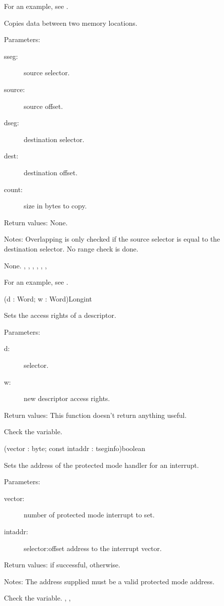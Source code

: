 For an example, see .

{Copies data between two memory locations.

Parameters: 
\begin{description}
\item[sseg:\ ] source selector. 
\item[source:\ ] source offset. 
\item[dseg:\ ] destination selector.
\item[dest:\ ] destination offset.
\item[count:\ ] size in bytes to copy.
\end{description}

Return values: None.

Notes: Overlapping is only checked if the source selector is equal to the
destination selector. No range check is done.
}
{ None.}
{ 
,
,
,
,
,
,
 }

For an example, see 
.

{(d : Word; w : Word)}{Longint}
{
Sets the access rights of a descriptor.

Parameters: 
\begin{description}
\item[d:\ ] selector.
\item[w:\ ] new descriptor access rights.
\end{description}

Return values: This function doesn't return anything useful.
}
{ Check the  variable.}
{
 }

{(vector : byte; const intaddr : tseginfo)}{boolean}
{Sets the address of the protected mode handler for an interrupt.

Parameters: 
\begin{description}
\item[vector:\ ] number of protected mode interrupt to set.
\item[intaddr:\ ] selector:offset address to the interrupt vector.
\end{description}

Return values:  if successful,  otherwise.

Notes: The address supplied must be a valid  
protected mode address.
}{ Check the  variable.}
{, 
,
 }

